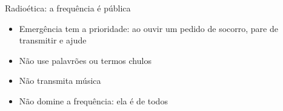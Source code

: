 \begin{frame}{Radioética: a frequência é pública}
  \begin{itemize}
  \item \alert<1>{Emergência tem a prioridade}: ao ouvir um pedido de socorro, pare de transmitir e
    ajude
  \item \alert<2>{Não use palavrões} ou termos chulos
  \item \alert<3>{Não transmita música}
  \item \alert<4>{Não domine a frequência}: ela é de todos
  \end{itemize}

  \bigskip\raggedleft
\end{frame}


